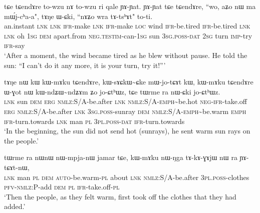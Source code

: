\documentclass[12pt]{article}
\newcommand{\ipab}[1]{{\phon#1}}
\newcommand{\tld}{\textasciitilde{}}
\newcommand{\gltt}{ \vspace{-1em}  \glt}
\begin{document}
\begin{myexe} 
\gll   \ipab{toʁde} \ipab{tɕe} \ipab{tɕendɤre} \ipab{to-wzu} \ipab{nɤ} \ipab{to-wzu} \ipab{ri} \ipab{qale}  \ipab{ɲɤ-ɲat.} \ipab{ɲɤ-ɲat} \ipab{tɕe} \ipab{tɕendɤre,} \ipab{``wo,} \ipab{aʑo} \ipab{nɯ} \ipab{ma} \ipab{mɯ́j-cʰa-a",} \ipab{tɤŋe} \ipab{ɯ-ɕki,} \ipab{``nɤʑo} \ipab{wra} \ipab{tɤ-tsʰɤt"} \ipab{to-ti.} \\
  an.instant \textsc{lnk} \textsc{lnk}  \textsc{ifr}-make \textsc{lnk} \textsc{ifr}-make \textsc{loc} wind  \textsc{ifr}-be.tired \textsc{ifr}-be.tired \textsc{lnk} \textsc{lnk}   oh     1\textsc{sg} \textsc{dem} apart.from \textsc{neg}.\textsc{testim}-can-1\textsc{sg} sun  3\textsc{sg}.\textsc{poss}-\textsc{dat} 2\textsc{sg}    turn \textsc{imp}-try     \textsc{ifr}-say\\
 \gltt  `After a moment, the wind became tired as he blew without pause. He told the sun: ``I can't do it any more, it is your turn, try it!'''
\end{myexe} 

 

\begin{myexe} 
\gll   \ipab{tɕe} \ipab{tɤŋe} \ipab{nɯ} \ipab{kɯ} \ipab{kɯ-mɤku} \ipab{tɕendɤre,} \ipab{kɯ-sɤɕkɯ\tld{}ɕke} \ipab{mɯ-jo-tɕɤt} \ipab{kɯ,} \ipab{kɯ-mɤku} \ipab{tɕendɤre} \ipab{ɯ-ɣot} \ipab{nɯ} \ipab{kɯ-ndʑɯ\tld{}ndʑɤm} \ipab{ʑo} \ipab{jo-ɕtʰɯz,} \ipab{tɕe} \ipab{tɯrme} \ipab{ra} \ipab{nɯ-ɕki} \ipab{jo-ɕtʰɯz.} \\ 
  \textsc{lnk} sun    \textsc{dem} \textsc{erg} \textsc{nmlz}:S/A-be.after  \textsc{lnk}   \textsc{nmlz}:S/A-\textsc{emph}\tld{}be.hot \textsc{neg}-\textsc{ifr}-take.off \textsc{erg} \textsc{nmlz}:S/A-be.after \textsc{lnk}  3\textsc{sg}.\textsc{poss}-sunray  \textsc{dem} \textsc{nmlz}:S/A-\textsc{emph}\tld{}be.warm \textsc{emph} \textsc{ifr}-turn.towards \textsc{lnk} man    \textsc{pl}  3\textsc{pl}.\textsc{poss}-\textsc{dat} \textsc{ifr}-turn.towards\\ 
 \gltt  `In the beginning, the sun did not send hot (sunrays), he sent warm sun rays on the people.'
\end{myexe} 

 

\begin{myexe} 
\gll  \ipab{tɕendɤre} \ipab{tɯrme} \ipab{ra} \ipab{nɯnɯ} \ipab{nɯ-mpja-nɯ} \ipab{jamar} \ipab{tɕe,} \ipab{kɯ-mɤku}  \ipab{nɯ-ŋga} \ipab{tɤ-kɤ-ɣɤjɯ} \ipab{nɯ} \ipab{ra} \ipab{ɲɤ-tɕɤt-nɯ,} \\ 
 \textsc{lnk}  man    \textsc{pl}  \textsc{dem}   \textsc{auto}-be.warm-\textsc{pl}  about \textsc{lnk}  \textsc{nmlz}:S/A-be.after  3\textsc{pl}.\textsc{poss}-clothes \textsc{pfv}-\textsc{nmlz}:P-add     \textsc{dem} \textsc{pl}  \textsc{ifr}-take.off-\textsc{pl}\\ 
 \gltt  `Then the people, as they felt warm, first took off the clothes that they had added.'
\end{myexe} 
\end{document}
